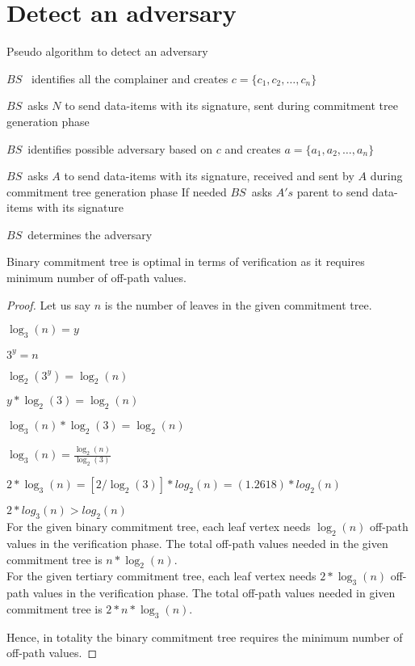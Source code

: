\section{Detect an adversary}
\begin{algorithm}
\caption{Pseudo algorithm to detect an adversary}

	\begin{algorithmic}[1]

			\STATE $BS$ \ identifies all the complainer and creates $c = \{c_{1}, c_{2}, \dotsc, c_{n}\}$

				\STATE $BS$\ asks $N$ to send data-items with its signature, sent during commitment tree generation phase
			
			\ENDFOR

			\STATE $BS$\ identifies possible adversary based on $c$ and creates $a = \{a_{1},a_{2},\dotsc,a_{n}\}$


				\STATE $BS$\ asks $A$ to send data-items with its signature, received and sent by $A$ during commitment tree generation phase
				\STATE If needed $BS$\  asks $A's$ parent to send data-items with its signature
	
			\ENDFOR

			\STATE $BS$\ determines the adversary 

	\end{algorithmic}
\end{algorithm}

\begin{theorem}
	\label{Commitment tree}
	Binary commitment tree is optimal in terms of verification as it requires minimum number of off-path values.
\end{theorem}

\begin{proof}
	Let us say $n$ is the number of leaves in the given commitment tree.

	$ \log _3( n ) = y $

	$ 3^y = n $

	$ \log_2( 3^y ) = \log_2( n ) $

	$ y * \log_2( 3 ) = \log_2( n ) $

	$ \log_3( n )*\log_2( 3 ) = \log_2( n ) $

	$ \log_3( n ) = \frac{ {\log _2 ( n )} }{{\log _2 ( 3 )}} $

	$ 2 * \log_3( n ) = [2 / \log_2( 3 ) ]* log_2( n ) = ( 1.2618 ) * log_2( n ) $

	$ 2 * log_3( n ) > log_2( n ) $ \\
	For the given binary commitment tree, each leaf vertex needs $\log_{2}(n)$ off-path values in the verification phase.
	The total off-path values needed in the given commitment tree is $n*\log_{2}(n)$.\\
	For the given tertiary commitment tree, each leaf vertex needs $2*\log_{3}(n)$ off-path values in the verification phase.
	The total off-path values needed in given commitment tree is $2*n*\log_{3}(n)$.

	Hence, in totality the binary commitment tree requires the minimum number of off-path values.
\end{proof}